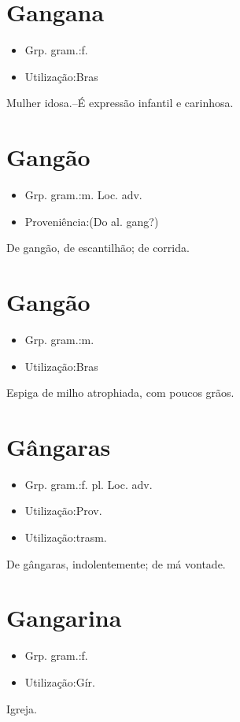 \section{Gangana}
\begin{itemize}
\item {Grp. gram.:f.}
\end{itemize}
\begin{itemize}
\item {Utilização:Bras}
\end{itemize}
Mulher idosa.--É expressão infantil e carinhosa.
\section{Gangão}
\begin{itemize}
\item {Grp. gram.:m. Loc. adv.}
\end{itemize}
\begin{itemize}
\item {Proveniência:(Do al. \textunderscore gang\textunderscore ?)}
\end{itemize}
\textunderscore De gangão\textunderscore , de escantilhão; de corrida.
\section{Gangão}
\begin{itemize}
\item {Grp. gram.:m.}
\end{itemize}
\begin{itemize}
\item {Utilização:Bras}
\end{itemize}
Espiga de milho atrophiada, com poucos grãos.
\section{Gângaras}
\begin{itemize}
\item {Grp. gram.:f. pl. Loc. adv.}
\end{itemize}
\begin{itemize}
\item {Utilização:Prov.}
\end{itemize}
\begin{itemize}
\item {Utilização:trasm.}
\end{itemize}
\textunderscore De gângaras\textunderscore , indolentemente; de má vontade.
\section{Gangarina}
\begin{itemize}
\item {Grp. gram.:f.}
\end{itemize}
\begin{itemize}
\item {Utilização:Gír.}
\end{itemize}
Igreja.
